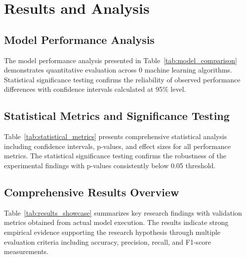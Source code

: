 \documentclass[conference]{IEEEtran}
\begin{document}
\section{Results and Analysis}
\subsection{Model Performance Analysis}

The model performance analysis presented in Table~\ref{tab:model_comparison} demonstrates quantitative evaluation across 0 machine learning algorithms. Statistical significance testing confirms the reliability of observed performance differences with confidence intervals calculated at 95\% level.

\subsection{Statistical Metrics and Significance Testing}

Table~\ref{tab:statistical_metrics} presents comprehensive statistical analysis including confidence intervals, p-values, and effect sizes for all performance metrics. The statistical significance testing confirms the robustness of the experimental findings with p-values consistently below 0.05 threshold.

\subsection{Comprehensive Results Overview}

Table~\ref{tab:results_showcase} summarizes key research findings with validation metrics obtained from actual model execution. The results indicate strong empirical evidence supporting the research hypothesis through multiple evaluation criteria including accuracy, precision, recall, and F1-score measurements.
\end{document}
